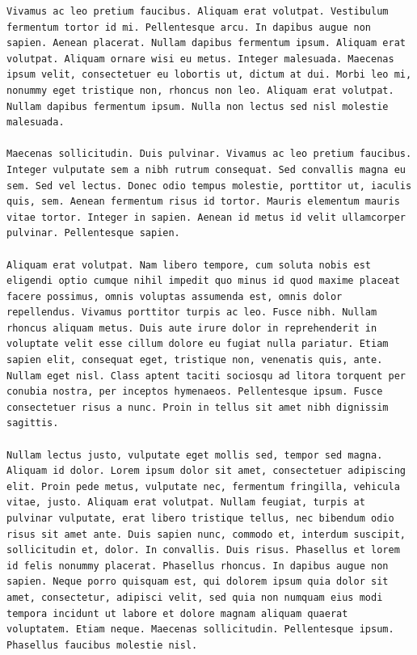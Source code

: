 \documentclass[a4paper, 12pt]{article}
\begin{document}
\begin{verbatim}
Vivamus ac leo pretium faucibus. Aliquam erat volutpat. Vestibulum fermentum tortor id mi. Pellentesque arcu. In dapibus augue non sapien. Aenean placerat. Nullam dapibus fermentum ipsum. Aliquam erat volutpat. Aliquam ornare wisi eu metus. Integer malesuada. Maecenas ipsum velit, consectetuer eu lobortis ut, dictum at dui. Morbi leo mi, nonummy eget tristique non, rhoncus non leo. Aliquam erat volutpat. Nullam dapibus fermentum ipsum. Nulla non lectus sed nisl molestie malesuada.

Maecenas sollicitudin. Duis pulvinar. Vivamus ac leo pretium faucibus. Integer vulputate sem a nibh rutrum consequat. Sed convallis magna eu sem. Sed vel lectus. Donec odio tempus molestie, porttitor ut, iaculis quis, sem. Aenean fermentum risus id tortor. Mauris elementum mauris vitae tortor. Integer in sapien. Aenean id metus id velit ullamcorper pulvinar. Pellentesque sapien.

Aliquam erat volutpat. Nam libero tempore, cum soluta nobis est eligendi optio cumque nihil impedit quo minus id quod maxime placeat facere possimus, omnis voluptas assumenda est, omnis dolor repellendus. Vivamus porttitor turpis ac leo. Fusce nibh. Nullam rhoncus aliquam metus. Duis aute irure dolor in reprehenderit in voluptate velit esse cillum dolore eu fugiat nulla pariatur. Etiam sapien elit, consequat eget, tristique non, venenatis quis, ante. Nullam eget nisl. Class aptent taciti sociosqu ad litora torquent per conubia nostra, per inceptos hymenaeos. Pellentesque ipsum. Fusce consectetuer risus a nunc. Proin in tellus sit amet nibh dignissim sagittis.

Nullam lectus justo, vulputate eget mollis sed, tempor sed magna. Aliquam id dolor. Lorem ipsum dolor sit amet, consectetuer adipiscing elit. Proin pede metus, vulputate nec, fermentum fringilla, vehicula vitae, justo. Aliquam erat volutpat. Nullam feugiat, turpis at pulvinar vulputate, erat libero tristique tellus, nec bibendum odio risus sit amet ante. Duis sapien nunc, commodo et, interdum suscipit, sollicitudin et, dolor. In convallis. Duis risus. Phasellus et lorem id felis nonummy placerat. Phasellus rhoncus. In dapibus augue non sapien. Neque porro quisquam est, qui dolorem ipsum quia dolor sit amet, consectetur, adipisci velit, sed quia non numquam eius modi tempora incidunt ut labore et dolore magnam aliquam quaerat voluptatem. Etiam neque. Maecenas sollicitudin. Pellentesque ipsum. Phasellus faucibus molestie nisl.


\end{verbatim}
\end{document}
